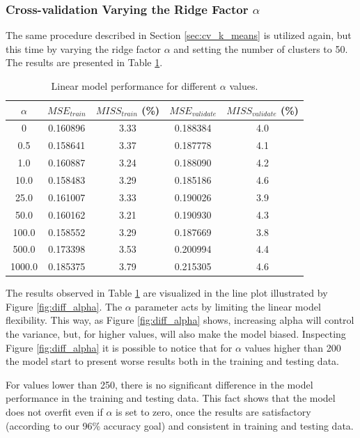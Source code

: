 \documentclass{article}
\begin{document}
\subsubsection{Cross-validation Varying the Ridge Factor $\alpha$}

The same procedure described in Section \ref{sec:cv_k_means} is utilized again, but this time by varying the ridge factor $\alpha$ and setting the number of clusters to 50. The results are presented in Table \ref{table:diff_alpha}.

\begin{table}[h!]
\begin{center}
 \begin{tabular}{||c | c | c | c | c||} 
 \hline
 $\alpha$ & $MSE_{train}$ & $MISS_{train}$ (\%) & $MSE_{validate}$ & $MISS_{validate}$ (\%) \\ [0.5ex]
 \hline\hline
 0 & 0.160896 & 3.33 & 0.188384 & 4.0\\ 
 \hline
 0.5 & 0.158641 & 3.37 & 0.187778 & 4.1\\
 \hline
 1.0 & 0.160887 & 3.24 & 0.188090 & 4.2\\
 \hline
 10.0 & 0.158483 & 3.29 & 0.185186 & 4.6\\
 \hline
 25.0 & 0.161007 & 3.33 & 0.190026 & 3.9\\
 \hline
  50.0 & 0.160162 & 3.21 & 0.190930 & 4.3\\
 \hline
  100.0 & 0.158552 & 3.29 & 0.187669 & 3.8\\
 \hline
  500.0 & 0.173398 & 3.53 & 0.200994 & 4.4\\
 \hline
  1000.0 & 0.185375 & 3.79 & 0.215305 & 4.6\\
 \hline
\end{tabular}
\caption{Linear model performance for different $\alpha$ values.}
\label{table:diff_alpha}
\end{center}
\end{table}

The results observed in Table \ref{table:diff_alpha} are visualized in the line plot illustrated by  Figure \ref{fig:diff_alpha}. The $\alpha$ parameter acts by limiting the linear model flexibility. This way, as Figure \ref{fig:diff_alpha} shows, increasing alpha will control the variance, but, for higher values, will also make the model biased. Inspecting Figure \ref{fig:diff_alpha} it is possible to notice that for $\alpha$ values higher than 200 the model start to present worse results both in the training and testing data.

For values lower than 250, there is no significant difference in the model performance in the training and testing data. This fact shows that the model does not overfit even if $\alpha$ is set to zero, once the results are satisfactory (according to our 96\% accuracy goal) and consistent in training and testing data.
\end{document}
